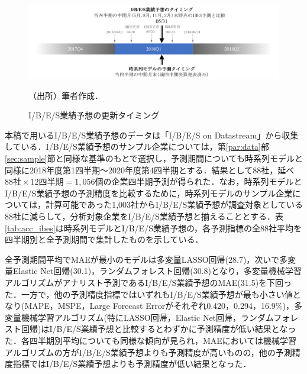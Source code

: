 \documentclass[a4paper，11pt]{jsarticle}
\begin{document}
\begin{figure}[tbp]
  \centering
  \caption{I/B/E/S業績予想の更新タイミング}
  \label{fig:ibes_timing}
  \includegraphics[width=0.65\linewidth]{./img/_ibes_timing.pdf}
  \begin{threeparttable}
  \begin{tablenotes}
    \item[]（出所）筆者作成．
  \end{tablenotes}
  \end{threeparttable}
\end{figure}

本稿で用いるI/B/E/S業績予想のデータは「I/B/E/S on Datastream」から収集している．I/B/E/S業績予想のサンプル企業については，第\ref{par:data}部\ref{sec:sample}節と同様な基準のもとで選択し，予測期間についても時系列モデルと同様に2018年度第1四半期～2020年度第4四半期とする．結果として88社，延べ $88社 \times 12四半期 = 1,056個$の企業四半期予測が得られた．なお，時系列モデルとI/B/E/S業績予想の予測精度を比較するために，時系列モデルのサンプル企業については，計算可能であった1,003社からI/B/E/S業績予想が調査対象としている88社に減らして，分析対象企業をI/B/E/S業績予想と揃えることとする．表\ref{tab:acc_ibes}は時系列モデルとI/B/E/S業績予想の，各予測指標の全88社平均を四半期別と全予測期間で集計したものを示している．

全予測期間平均でMAEが最小のモデルは多変量LASSO回帰(28.7)，次いで多変量Elastic Net回帰(30.1)，ランダムフォレスト回帰(30.8)となり，多変量機械学習アルゴリズムがアナリスト予測であるI/B/E/S業績予想のMAE(31.5)を下回った．一方で，他の予測精度指標ではいずれもI/B/E/S業績予想が最も小さい値となり(MAPE，MSPE，Large Forecast Errorがそれぞれ0.420，0.294，16.9\%)，多変量機械学習アルゴリズム(特にLASSO回帰，Elastic Net回帰，ランダムフォレスト回帰)はI/B/E/S業績予想と比較するとわずかに予測精度が低い結果となった．各四半期別平均についても同様な傾向が見られ，MAEにおいては機械学習アルゴリズムの方がI/B/E/S業績予想よりも予測精度が高いものの，他の予測精度指標ではI/B/E/S業績予想よりも予測精度が低い結果となった．

\end{document}
